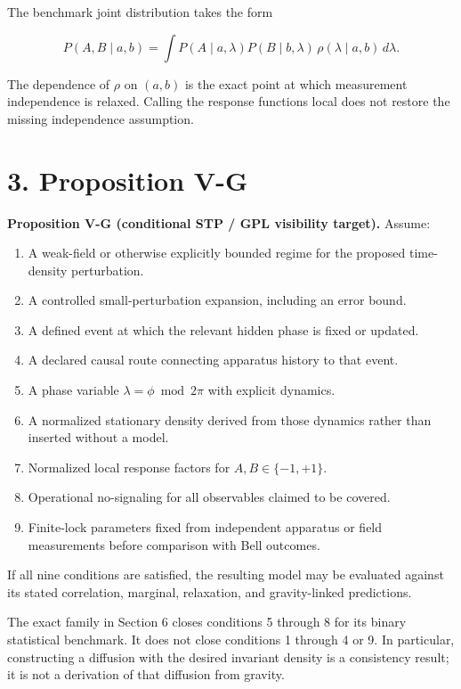 \documentclass[
  american,
  11pt,
  letterpaper,
]{article}
\providecommand{\tightlist}{%
  \setlength{\itemsep}{0pt}\setlength{\parskip}{0pt}}
\begin{document}
The benchmark joint distribution takes the form

\begin{equation}
P(A,B\mid a,b)=\int P(A\mid a,\lambda)P(B\mid b,\lambda)\,
\rho(\lambda\mid a,b)\,d\lambda .
\tag{1}
\end{equation}

The dependence of \(\rho\) on \((a,b)\) is the exact point at which measurement independence is relaxed. Calling the response functions local does not restore the missing independence assumption.

\section{3. Proposition V-G}\label{proposition-v-g}

\textbf{Proposition V-G (conditional STP / GPL visibility target).} Assume:

\begin{enumerate}
\def\labelenumi{\arabic{enumi}.}
\tightlist
\item
  A weak-field or otherwise explicitly bounded regime for the proposed time-density perturbation.
\item
  A controlled small-perturbation expansion, including an error bound.
\item
  A defined event at which the relevant hidden phase is fixed or updated.
\item
  A declared causal route connecting apparatus history to that event.
\item
  A phase variable \(\lambda=\phi\bmod 2\pi\) with explicit dynamics.
\item
  A normalized stationary density derived from those dynamics rather than inserted without a model.
\item
  Normalized local response factors for \(A,B\in\{-1,+1\}\).
\item
  Operational no-signaling for all observables claimed to be covered.
\item
  Finite-lock parameters fixed from independent apparatus or field measurements before comparison with Bell outcomes.
\end{enumerate}

If all nine conditions are satisfied, the resulting model may be evaluated against its stated correlation, marginal, relaxation, and gravity-linked predictions.

The exact family in Section 6 closes conditions 5 through 8 for its binary statistical benchmark. It does not close conditions 1 through 4 or 9. In particular, constructing a diffusion with the desired invariant density is a consistency result; it is not a derivation of that diffusion from gravity.
\end{document}
